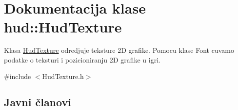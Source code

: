 \hypertarget{classhud_1_1HudTexture}{}\section{Dokumentacija klase hud\+:\+:Hud\+Texture}
\label{classhud_1_1HudTexture}


Klasa \hyperlink{classhud_1_1HudTexture}{Hud\+Texture} odredjuje teksture 2D grafike. Pomocu klase Font cuvamo podatke o teksturi i pozicioniranju 2D grafike u igri.  




{\ttfamily \#include $<$Hud\+Texture.\+h$>$}

\subsection*{Javni članovi}
